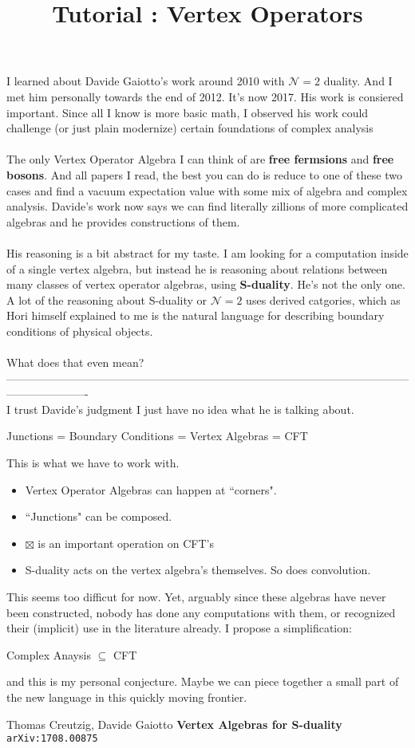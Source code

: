 \documentclass[12pt]{article}
\title{Tutorial : Vertex Operators}
\date{}
\newcommand{\linebrk}{----------------------------------------------------------------------------------------------------------------------------------}
\begin{document}
\selectfont \fontsize{12.5}{15}\selectfont

\maketitle

\noindent I learned about Davide Gaiotto's work around 2010 with $\mathcal{N}=2$ duality.  And I met him personally towards the end of 2012.  It's now 2017.  His work is consiered important.  Since all I know is more basic math, I observed his work could challenge (or just plain modernize) certain foundations of complex analysis \\ \\
The only Vertex Operator Algebra I can think of are \textbf{free fermsions} and \textbf{free bosons}.  And all papers I read, the best you can do is reduce to one of these two cases and find a {\color{blue}vacuum expectation value} with some mix of algebra and complex analysis.  Davide's work now says we can find literally zillions of more complicated algebras and he provides constructions of them.  \\ \\
His reasoning is a bit abstract for my taste.  I am looking for a computation inside of a single vertex algebra, but instead he is reasoning about relations between many classes of vertex operator algebras, using \textbf{S-duality}.  He's not the only one.  A lot of the reasoning about S-duality or $\mathcal{N}=2$ uses {\color{green}derived catgories}, which as Hori himself explained to me is the natural language for describing boundary conditions of physical objects. \\ \\
What does that even mean? \\
\linebrk \\
I trust Davide's judgment I just have no idea what he is talking about.  
\begin{center}
Junctions = Boundary Conditions = Vertex Algebras = CFT
\end{center}
This is what we have to work with. 
\begin{itemize}
\item Vertex Operator Algebras can happen at ``corners".
\item ``Junctions" can be composed.
\item $\boxtimes$ is an important operation on CFT's 
\item S-duality acts on the vertex algebra's themselves.  So does convolution.
\end{itemize}
This seems too difficut for now.  Yet, arguably since these algebras have never been constructed, nobody has done any computations with them, or recognized their (implicit) use in the literature already.   I propose a simplification:
\begin{center}
Complex Anaysis $\subseteq$ CFT
\end{center}
and this is my personal conjecture.  Maybe we can piece together a small part of the new language in this quickly moving frontier.

\vfill

\begin{thebibliography}{}

\item Thomas Creutzig, Davide Gaiotto \textbf{Vertex Algebras for S-duality} \texttt{arXiv:1708.00875}

\end{thebibliography}
\end{document}
